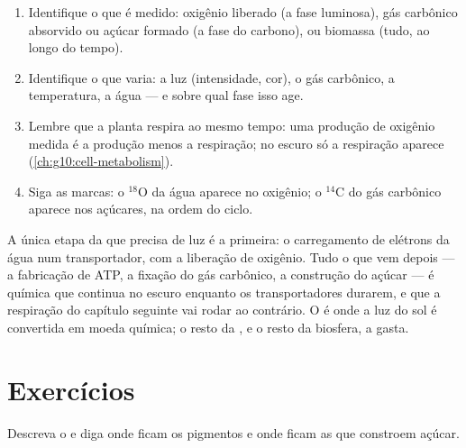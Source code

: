 \begin{method}\label{met:g12:photosynthesis:experiment}
\begin{enumerate}
  \item Identifique o que é medido: oxigênio liberado (a fase
        luminosa), gás carbônico absorvido ou açúcar formado (a fase do
        carbono), ou biomassa (tudo, ao longo do tempo).
  \item Identifique o que varia: a luz (intensidade, cor), o gás
        carbônico, a temperatura, a água --- e sobre qual fase isso age.
  \item Lembre que a planta respira ao mesmo tempo: uma produção de
        oxigênio medida é a produção menos a respiração; no escuro só a
        respiração aparece (\cref{ch:g10:cell-metabolism}).
  \item Siga as marcas: o $^{18}$O da água aparece no oxigênio; o
        $^{14}$C do gás carbônico aparece nos açúcares, na ordem do
        ciclo.
\end{enumerate}
\end{method}

\begin{remark}\label{rem:g12:photosynthesis:light}
A única etapa da  que precisa de luz é a primeira: o
carregamento de elétrons da água num transportador, com a liberação de
oxigênio. Tudo o que vem depois --- a fabricação de ATP, a fixação do
gás carbônico, a construção do açúcar --- é química que continua no
escuro enquanto os transportadores durarem, e que a respiração do
capítulo seguinte vai rodar ao contrário. O  é onde a luz do
sol é convertida em moeda química; o resto da , e o resto da
biosfera, a gasta.
\end{remark}

\section{Exercícios}

\begin{exercise}[$\star$]\label{exo:g12:photosynthesis:1}
Descreva o  e diga onde ficam os pigmentos e onde ficam as
 que constroem açúcar.
\end{exercise}

